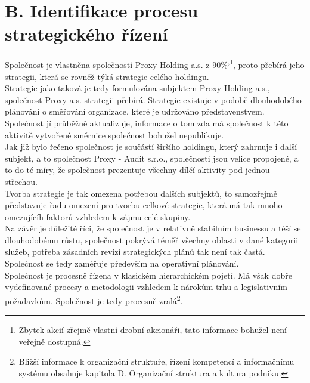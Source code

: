 \section*{B. Identifikace procesu strategického řízení}
\label{sec:Identifikace procesu strategickeho rizeni}

Společnost je vlastněna společností Proxy Holding a.s. z 90\%\textsuperscript{,}\footnote{Zbytek akcií zřejmě vlastní drobní akcionáři, tato informace bohužel není veřejně dostupná.}, proto přebírá jeho strategii, která se rovněž týká strategie celého holdingu.\\

Strategie jako taková je tedy formulována subjektem Proxy Holding a.s., společnost Proxy a.s. strategii přebírá. Strategie existuje v podobě dlouhodobého plánování o směřování organizace, které je udržováno představenstvem. Společnost jí průběžně aktualizuje, informace o tom zda má společnost k této aktivitě vytvořené směrnice společnost bohužel nepublikuje.\\

Jak již bylo řečeno společnost je součástí širšího holdingu, který zahrnuje i další subjekt, a to společnost Proxy - Audit s.r.o., společnosti jsou velice propojené, a to do té míry, že společnost prezentuje všechny dílčí aktivity pod jednou střechou.\\

Tvorba strategie je tak omezena potřebou dalších subjektů, to samozřejmě představuje řadu omezení pro tvorbu celkové strategie, která má tak mnoho omezujícíh faktorů vzhledem k zájmu celé skupiny.\\

Na závěr je důležité říci, že společnost je v relativně stabilním businessu a těší se dlouhodobému růstu, společnost pokrývá téměř všechny oblasti v dané kategorii služeb, potřeba zásadních revizí strategických plánů tak není tak častá. Společnost se tedy zaměřuje především na operativní plánování.\\

Společnost je procesně řízena v klasickém hierarchickém pojetí. Má však dobře vydefinované procesy a metodologii vzhledem k nárokům trhu a legislativním požadavkům. Společnost je tedy procesně zralá\footnote{Bližší informace k organizační struktuře, řízení kompetencí a informačnímu systému obsahuje kapitola D. Organizační struktura a kultura podniku.}.\\

